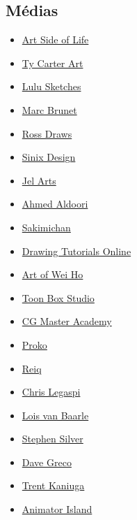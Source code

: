 \documentclass[12pt]{article}
\begin{document}
\subsection*{Médias}
\begin{itemize}
    \item \href{https://www.youtube.com/c/ArtSideofLife/featured}{Art Side of Life}
    \item \href{https://www.youtube.com/c/TyCarterArt/videos}{Ty Carter Art}
    \item \href{https://www.youtube.com/c/lulusketches}{Lulu Sketches}
    \item \href{https://www.youtube.com/c/bluefley00}{Marc Brunet}
    \item \href{https://www.youtube.com/c/Rossdraws}{Ross Draws}
    \item \href{https://www.youtube.com/user/sinixdesign/featured}{Sinix Design}
    \item \href{https://www.youtube.com/c/JelArts}{Jel Arts}
    \item \href{https://www.youtube.com/c/AhmedAldoori}{Ahmed Aldoori}
    \item \href{https://www.youtube.com/c/sakimichanOfficalArt}{Sakimichan}
    \item \href{https://www.youtube.com/c/DrawingTutorialsOnline}{Drawing Tutorials Online}
    \item \href{https://www.youtube.com/c/ArtofWeiHo}{Art of Wei Ho}
    \item \href{https://www.youtube.com/c/Toonboxstudio}{Toon Box Studio}
    \item \href{https://www.youtube.com/c/CGMasterAcademyCGMA}{CG Master Academy}
    \item \href{https://www.youtube.com/c/ProkoTV}{Proko}
    \item \href{https://www.youtube.com/c/reiqws}{Reiq}
    \item \href{https://www.youtube.com/c/ChrisLegaspi_art}{Chris Legaspi}
    \item \href{https://www.youtube.com/channel/UC1UD10HC9qZo1qfdl-OV9kw}{Lois van Baarle}
    \item \href{https://www.youtube.com/c/StephenSilver}{Stephen Silver}
    \item \href{https://www.youtube.com/c/DaveGreco}{Dave Greco}
    \item \href{https://www.youtube.com/c/TrentKaniuga}{Trent Kaniuga}
    \item \href{https://www.youtube.com/user/AnimatorIslandTV}{Animator Island}

\end{itemize}
\end{document}
